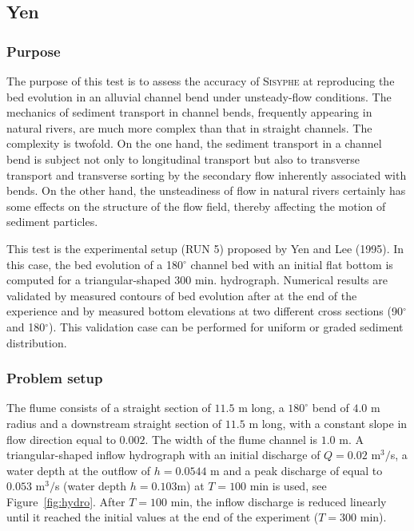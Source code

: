 \subsection{Yen}
%

%
\subsubsection{Purpose}
%
The purpose of this test is to assess the accuracy of \textsc{Sisyphe} at reproducing the bed evolution in an alluvial channel bend under unsteady-flow conditions. The mechanics of sediment transport in channel bends, frequently appearing in natural rivers, are much more complex than that in straight channels. The complexity is twofold. On the one hand, the sediment transport in a channel bend is subject not only to longitudinal transport but also to transverse transport and transverse sorting by the secondary flow inherently associated with bends. On the other hand, the unsteadiness of flow in natural rivers certainly has some effects on the structure of the flow field, thereby affecting the motion of sediment particles.

This test is the experimental setup (RUN 5) proposed by Yen and Lee (1995). In this case, the bed evolution of a 180$^{\circ}$ channel bed with an initial flat bottom is computed for a triangular-shaped $300$ min. hydrograph. Numerical results are validated by measured contours of bed evolution after at the end of the experience and by measured bottom elevations at
two different cross sections (90$^{\circ}$ and 180$^{\circ}$). This validation case can be performed for uniform or graded sediment distribution. 
%
\subsubsection{Problem setup}
%
The flume consists of a straight section of $11.5$ m long, a $180^{\circ}$ bend of $4.0$ m radius and a downstream straight section of
$11.5$ m long, with a constant slope in flow direction equal to $0.002$. The width of the flume channel is $1.0$ m. A triangular-shaped inflow hydrograph with an initial discharge of $Q=0.02$ m$^3/$s, a water depth at the outflow of $h = 0.0544$ m and a peak discharge of equal to $0.053$ m$^3/$s (water depth $h=0.103$m) at $T = 100$ min
is used, see Figure~\ref{fig:hydro}. After $T = 100$ min, the inflow discharge is reduced linearly until it reached the initial values at the end of the experiment ($T = 300$ min).

